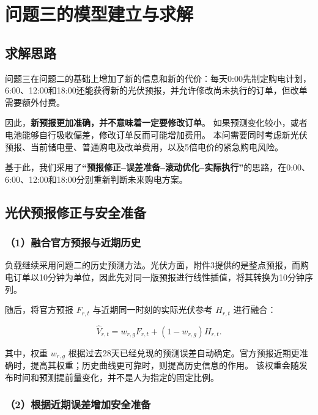 \section{问题三的模型建立与求解}

\subsection{求解思路}

问题三在问题二的基础上增加了新的信息和新的代价：每天0:00先制定购电计划，
6:00、12:00和18:00还能获得新的光伏预报，并允许修改尚未执行的订单，但改单需要额外付费。

因此，\textbf{新预报更加准确，并不意味着一定要修改订单}。
如果预测变化较小，或者电池能够自行吸收偏差，修改订单反而可能增加费用。
本问需要同时考虑新光伏预报、当前储电量、普通购电及改单费用，以及5倍电价的紧急购电风险。

基于此，我们采用了\textbf{``预报修正--误差准备--滚动优化--实际执行''}的思路，在0:00、6:00、12:00和18:00分别重新判断未来购电方案。


\subsection{光伏预报修正与安全准备}

\subsubsection*{（1）融合官方预报与近期历史}

负载继续采用问题二的历史预测方法。光伏方面，附件3提供的是整点预报，而购电订单以10分钟为单位，因此先对同一版预报进行线性插值，将其转换为10分钟序列。

随后，将官方预报 $F_{r,t}$ 与近期同一时刻的实际光伏参考 $H_{r,t}$ 进行融合：

\begin{equation}
\widehat V_{r,t}
=
w_{r,g}F_{r,t}
+
(1-w_{r,g})H_{r,t}.
\end{equation}

其中，权重 $w_{r,g}$ 根据过去28天已经兑现的预测误差自动确定。官方预报近期更准确时，提高其权重；历史曲线更可靠时，则提高历史信息的作用。
该权重会随发布时间和预测提前量变化，并不是人为指定的固定比例。

\subsubsection*{（2）根据近期误差增加安全准备}

